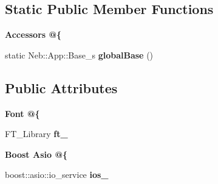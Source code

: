 \subsection*{\-Static \-Public \-Member \-Functions}
\begin{Indent}{\bf \-Accessors @\{}\par
\begin{DoxyCompactItemize}
\item 
\hypertarget{classNeb_1_1App_1_1Base_a07fbe923b685fd30e7a9e34473a8b67f}{static \-Neb\-::\-App\-::\-Base\-\_\-s {\bfseries global\-Base} ()}\label{classNeb_1_1App_1_1Base_a07fbe923b685fd30e7a9e34473a8b67f}

\end{DoxyCompactItemize}
\end{Indent}
\subsection*{\-Public \-Attributes}
\begin{Indent}{\bf \-Font @\{}\par
\begin{DoxyCompactItemize}
\item 
\hypertarget{classNeb_1_1App_1_1Base_a957424f530de5476709d7046653d7567}{\-F\-T\-\_\-\-Library {\bfseries ft\-\_\-}}\label{classNeb_1_1App_1_1Base_a957424f530de5476709d7046653d7567}

\end{DoxyCompactItemize}
\end{Indent}
\begin{Indent}{\bf \-Boost \-Asio @\{}\par
\begin{DoxyCompactItemize}
\item 
\hypertarget{classNeb_1_1App_1_1Base_a99c95783c97c8e34ad2fafd1806367e2}{boost\-::asio\-::io\-\_\-service {\bfseries ios\-\_\-}}\label{classNeb_1_1App_1_1Base_a99c95783c97c8e34ad2fafd1806367e2}

\end{DoxyCompactItemize}
\end{Indent}
